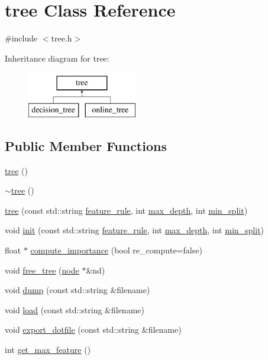 \hypertarget{classtree}{\section{tree Class Reference}
\label{classtree}
}


{\ttfamily \#include $<$tree.\+h$>$}

Inheritance diagram for tree\+:\begin{figure}[H]
\begin{center}
\leavevmode
\includegraphics[height=2.000000cm]{classtree}
\end{center}
\end{figure}
\subsection*{Public Member Functions}
\begin{DoxyCompactItemize}
\item 
\hyperlink{classtree_a9f2a566ac2710fafc31232456780e82d}{tree} ()
\item 
\hyperlink{classtree_a05f3faa3c9a8f6fed237e2d0f6172244}{$\sim$tree} ()
\item 
\hyperlink{classtree_a356d6ebfe68b6e4ac466664c4f2d2581}{tree} (const std\+::string \hyperlink{classtree_a5aba3b77a347165517a20d5fab94382d}{feature\+\_\+rule}, int \hyperlink{classtree_a0a9f968fac827d3239be67488c34fb21}{max\+\_\+depth}, int \hyperlink{classtree_ae70cd626c0b50a0b8306a94a9e5e8fd7}{min\+\_\+split})
\item 
void \hyperlink{classtree_a03aebcb3102b4f6503b5bc69288297e8}{init} (const std\+::string \hyperlink{classtree_a5aba3b77a347165517a20d5fab94382d}{feature\+\_\+rule}, int \hyperlink{classtree_a0a9f968fac827d3239be67488c34fb21}{max\+\_\+depth}, int \hyperlink{classtree_ae70cd626c0b50a0b8306a94a9e5e8fd7}{min\+\_\+split})
\item 
float $\ast$ \hyperlink{classtree_ae03f6dd2597846c65c1c037728b06bcd}{compute\+\_\+importance} (bool re\+\_\+compute=false)
\item 
void \hyperlink{classtree_a4ca3902b09e854a76f1fb56bb71599f6}{free\+\_\+tree} (\hyperlink{classnode}{node} $\ast$\&nd)
\item 
void \hyperlink{classtree_a634ee04f1f89801a9f295e11cc5ce149}{dump} (const std\+::string \&filename)
\item 
void \hyperlink{classtree_a680d0cc993c3a3d3ef10c891de69960f}{load} (const std\+::string \&filename)
\item 
void \hyperlink{classtree_abc6048c70de7490eabf2433d46067b7b}{export\+\_\+dotfile} (const std\+::string \&filename)
\item 
int \hyperlink{classtree_a8042d0897915fdfeeca4b4d75515b96c}{get\+\_\+max\+\_\+feature} ()
\end{DoxyCompactItemize}
